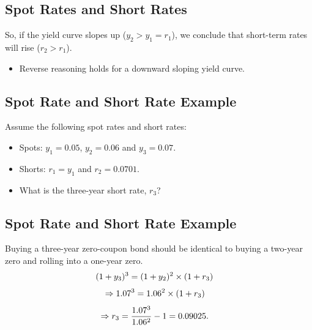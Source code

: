 \documentclass[letterpaper,10pt,english]{sphinxmanual}
\begin{document}
\subsection{Spot Rates and Short Rates}
\label{termStructure:id3}
So, if the yield curve slopes up ($y_2 > y_1 = r_1$), we
conclude that short-term rates will rise ($r_2 > r_1$).
\begin{itemize}
\item {} 
Reverse reasoning holds for a downward sloping yield curve.

\end{itemize}


\subsection{Spot Rate and Short Rate Example}
\label{termStructure:spot-rate-and-short-rate-example}
Assume the following spot rates and short rates:
\begin{itemize}
\item {} 
Spots: $y_1 = 0.05$, $y_2 = 0.06$ and $y_3 =
0.07$.

\end{itemize}
\begin{itemize}
\item {} 
Shorts: $r_1 = y_1$ and $r_2 = 0.0701$.

\end{itemize}
\begin{itemize}
\item {} 
What is the three-year short rate, $r_3$?

\end{itemize}


\subsection{Spot Rate and Short Rate Example}
\label{termStructure:id4}
Buying a three-year zero-coupon bond should be identical to buying a
two-year zero and rolling into a one-year zero.
\begin{gather}
\begin{split}(1+y_3)^3 & = (1+y_2)^2 \times (1+r_3)\end{split}\notag
\end{gather}\begin{gather}
\begin{split}\Rightarrow 1.07^3 & = 1.06^2 \times (1+r_3)\end{split}\notag
\end{gather}\begin{gather}
\begin{split}\Rightarrow r_3 & = \frac{1.07^3}{1.06^2} - 1 = 0.09025.\end{split}\notag
\end{gather}
\end{document}
